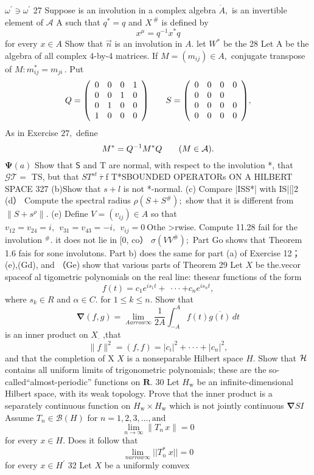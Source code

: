 $\omega^{\prime}\ni\omega^{\prime}$ 27 Suppose is an involution in a complex algebra ${\dot{A}},$ is an invertible element of $\textstyle{\mathcal{A}}$ A such that $q^{*}=q$ and $\displaystyle{X^{\ \#}}$ is defined by $$ x^{\mu}=q^{-1}x^{*}q $$ for every $x\in A$ Show that $\scriptstyle{\vec{n}}$ is an involution in $A.$ let $\textstyle W^{*}$ be the 28 Let A be the algebra of all complex 4-by-4 matrices. If $M=(m_{i j})\in A,$ conjugate transpose of $M\colon m_{i j}^{*}=m_{j i}\,.$ Put $$ Q={\left(\begin{array}{l l l l l}{0}&{0}&{0}&{1}\\ {0}&{0}&{1}&{0}\\ {0}&{1}&{0}&{0}\\ {1}&{0}&{0}&{0}\end{array}\right)}\qquad S={\left(\begin{array}{l l l l l}{0}&{0}&{0}&{0}\\ {0}&{0}&{0}\\ {0}&{0}&{0}&{0}\\ {0}&{0}&{0}&{0}\end{array}\right)}, $$ As in Exercise $27,$ define $$ M^{*}=Q^{-1}M^{*}Q\;\;\;\;\;\;\;(M\in{\cal A}). $$ $\mathbf{\Psi}(a)$ Show that $\boldsymbol{\mathsf{S}}$ and T are normal, with respect to the involution *, that ${\mathcal{G T}}=$ TS, but that $S T^{s t}\ \overline{{{\tau}}}$ f T*SBOUNDED OPERATORs ON A HILBERT SPACE 327 (b)Show that $\textstyle s+l$ is not *-normal. (c) Compare |ISS*| with IS||]2 (d） Compute the spectral radius $\rho(S+S^{\#}){\mathrm{;}}$ show that it is different from $\|S+s^{\rho}\|.$ (e) Define $V=(v_{i j})\in A$ so that $v_{12}=v_{24}=i,\ \ v_{31}=v_{43}=-i,\ \ v_{i j}=0\ \mathrm{Othe}$ >rwise. Compute 11.28 fail for the involution ${}^{\#}.$ it does not lie in [0, co） $\sigma(V V^{\#});$ Part Go shows that Theorem 1.6 fais for sone involutons. Part b) does the same for part (a) of Exercise 12；(e),(Gd), and （Ge) show that various parts of Theorem 29 Let $\textstyle X$ be the.vecor spaceof al tigometric polynomials on the real line: thesear functions of the form $$ f(t)=c_{1}e^{i s_{1}t}+\ \cdot\cdot\cdot+c_{n}e^{i s_{n}t}, $$ where $s_{k}\in R$ and $\alpha\in C.$ for $1\leq k\leq n.$ Show that $$ \mathbf{\nabla}(f,g)=\operatorname*{lim}_{A arrow\infty}{\frac{1}{2A}}\int_{-A}^{A}f(t){\overline{{g(t)}}}\,d t $$ is an inner product on $X_{\cdot}$ ,that $$ \|f\|^{2}=(f,f)=\left|c_{i}\right|^{2}+\cdot\cdot\cdot+\left|c_{n}\right|^{2}, $$ and that the completion of X $\textstyle X$ is a nonseparable Hilbert space $\textstyle H.$ Show that ${\cal H}$ contains all uniform limits of trigonometric polynomials; these are the so-called“almost-periodic” functions on ${\boldsymbol{R}}.$ 30 Let $H_{\mathrm{w}}$ be an infinite-dimensional Hilbert space, with its weak topology. Prove that the inner product is a separately continuous function on $H_{\mathrm{w}}\times H_{\mathrm{w}}$ which is not jointly continuous ${\mathbf{\nabla}}S I$ Assume $T_{n}\in{\mathcal{B}}(H)$ for $n=1,2,3,\ldots,\mathrm{and}$ $$ \operatorname*{lim}_{n\to\infty}\left\|T_{n}\,x\right\|=0 $$ for every $x\in H.$ Does it follow that $$ \operatorname*{lim}_{n arrow\infty}||T_{n}^{*}\:x||=0 $$ for every $x\in H^{\prime}$ 32 Let $\textstyle X$ be a uniformly comvex 